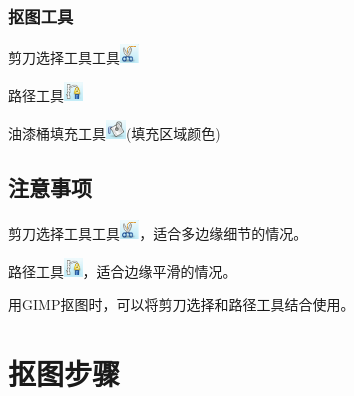 \documentclass[12pt]{article}
\begin{document}
\subsubsection*{抠图工具}
\begin{itemize*}
\item 剪刀选择工具工具\includegraphics[height=0.2in]{jiandao.png}
\item 路径工具\includegraphics[height=0.2in]{lujing.png}
\item 油漆桶填充工具\includegraphics[height=0.2in]{youqitong1.png}(填充区域颜色)
\end{itemize*}

\subsection*{注意事项}
\begin{itemize*}
\item 剪刀选择工具工具\includegraphics[height=0.2in]{jiandao.png}，适合多边缘细节的情况。
\item 路径工具\includegraphics[height=0.2in]{lujing.png}，适合边缘平滑的情况。
\item 用GIMP抠图时，可以将剪刀选择和路径工具结合使用。
\end{itemize*}



\section{抠图步骤}
\end{document}

